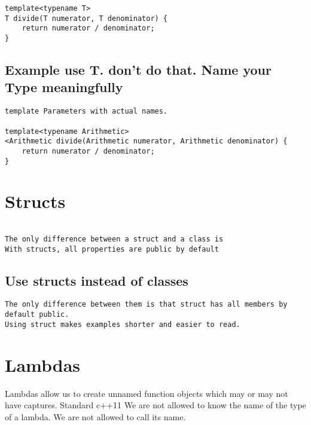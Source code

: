 \documentclass[openany]{report}
\begin{document}
\begin{verbatim}
template<typename T>
T divide(T numerator, T denominator) {
    return numerator / denominator;
}
\end{verbatim}

\subsection{Example use T. don't do that. Name your Type meaningfully}

\begin{verbatim}
template Parameters with actual names. 

template<typename Arithmetic>
<Arithmetic divide(Arithmetic numerator, Arithmetic denominator) {
    return numerator / denominator;
}
\end{verbatim}

\section{Structs}
\begin{verbatim}

The only difference between a struct and a class is
With structs, all properties are public by default
\end{verbatim}

\subsection{Use structs instead of classes}
\begin{verbatim}
The only difference between them is that struct has all members by default public.
Using struct makes examples shorter and easier to read. 
\end{verbatim}

\section{Lambdas}

Lambdas allow us to create unnamed function objects which may or may not have captures.
Standard c++11
We are not allowed to know the name of the type of a lambda. We are not allowed to call its name.
\end{document}
